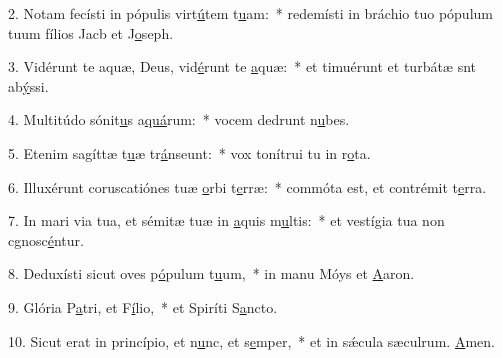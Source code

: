 2. Notam fecísti in pópulis virt\uline{ú}tem t\uline{u}am:~* redemísti in bráchio tuo pópulum tuum fílios Jacb et J\uline{o}seph.\par 
3. Vidérunt te aquæ, Deus, vid\uline{é}runt te \uline{a}quæ:~* et timuérunt et turbátæ snt ab\uline{ý}ssi.\par 
4. Multitúdo sónit\uline{u}s a\uline{quá}rum:~* vocem dedrunt n\uline{u}bes.\par 
5. Etenim sagíttæ t\uline{u}æ tr\uline{á}nseunt:~* vox tonítrui tu in r\uline{o}ta.\par 
6. Illuxérunt coruscatiónes tuæ \uline{o}rbi t\uline{e}rræ:~* commóta est, et contrémit t\uline{e}rra.\par 
7. In mari via tua, et sémitæ tuæ in \uline{a}quis m\uline{u}ltis:~* et vestígia tua non cgnosc\uline{é}ntur.\par 
8. Deduxísti sicut oves p\uline{ó}pulum t\uline{u}um,~* in manu Móys et \uline{A}aron.\par 
9. Glória P\uline{a}tri, et F\uline{í}lio,~* et Spiríti S\uline{a}ncto.\par 
10. Sicut erat in princípio, et n\uline{u}nc, et s\uline{e}mper,~* et in sǽcula sæculrum. \uline{A}men.\par 
